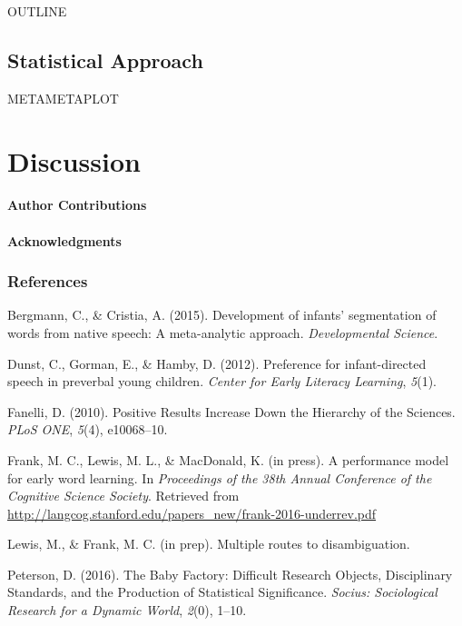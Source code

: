 \documentclass[american,floatsintext,man]{apa6}
\newcounter{author}
\begin{document}
OUTLINE

\subsection{Statistical Approach}\label{statistical-approach}

METAMETAPLOT

\section{Discussion}\label{discussion}

\paragraph{Author Contributions}\label{author-contributions}

\paragraph{Acknowledgments}\label{acknowledgments}

\newpage

\subsubsection{References}\label{references}

\setlength{\parindent}{-0.5in} \setlength{\leftskip}{0.5in}
\setlength{\parskip}{8pt}

Bergmann, C., \& Cristia, A. (2015). Development of infants'
segmentation of words from native speech: A meta-analytic approach.
\emph{Developmental Science}.

Dunst, C., Gorman, E., \& Hamby, D. (2012). Preference for
infant-directed speech in preverbal young children. \emph{Center for
Early Literacy Learning}, \emph{5}(1).

Fanelli, D. (2010). Positive Results Increase Down the Hierarchy of the
Sciences. \emph{PLoS ONE}, \emph{5}(4), e10068--10.

Frank, M. C., Lewis, M. L., \& MacDonald, K. (in press). A performance
model for early word learning. In \emph{Proceedings of the 38th Annual
Conference of the Cognitive Science Society}. Retrieved from
\url{http://langcog.stanford.edu/papers_new/frank-2016-underrev.pdf}

Lewis, M., \& Frank, M. C. (in prep). Multiple routes to disambiguation.

Peterson, D. (2016). The Baby Factory: Difficult Research Objects,
Disciplinary Standards, and the Production of Statistical Significance.
\emph{Socius: Sociological Research for a Dynamic World}, \emph{2}(0),
1--10.
\end{document}

